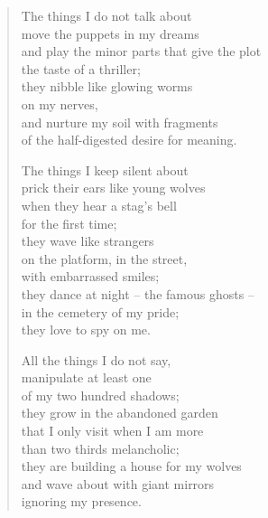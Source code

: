 \begin{verse}

The things I do not talk about\\
move the puppets in my dreams\\
and play the minor parts that give the plot\\
the taste of a thriller;\\
they nibble like glowing worms\\
on my nerves,\\
and nurture my soil with fragments\\
of the half-digested desire for meaning.

The things I keep silent about\\
prick their ears like young wolves\\
when they hear a stag's bell\\
for the first time;\\
they wave like strangers\\
on the platform, in the street,\\
with embarrassed smiles;\\
they dance at night -- the famous ghosts --\\
in the cemetery of my pride;\\
they love to spy on me.

All the things I do not say,\\
manipulate at least one\\
of my two hundred shadows;\\
they grow in the abandoned garden\\
that I only visit when I am more\\
than two thirds melancholic;\\
they are building a house for my wolves\\
and wave about with giant mirrors\\
ignoring my presence.

\end{verse}

